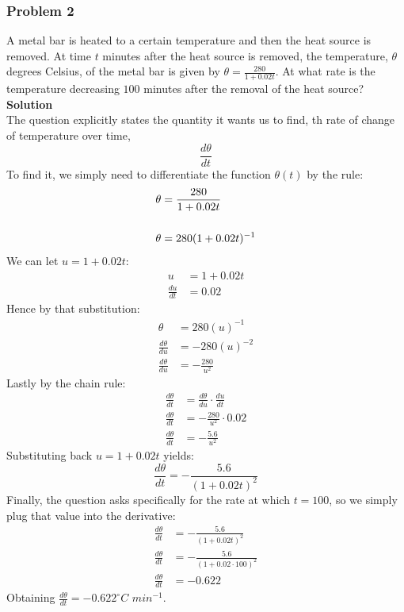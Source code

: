 \documentclass[hidelinks, a4paper, 12pt]{article}
\newcommand{\bd}{\textbf}
\newcommand{\n}{\\[\baselineskip]}
\begin{document}
            \subsubsection{Problem 2}
                A metal bar is heated to a certain temperature and then the heat source is removed. At time $t$ minutes after the heat source is removed,
                the temperature, $\theta$ degrees Celsius, of the metal bar is given by $\theta = \frac{280}{1+0.02t}$. At what rate is the temperature
                decreasing $100$ minutes after the removal of the heat source?\n
                \bd{Solution}\n
                The question explicitly states the quantity it wants us to find, th rate of change of temperature over time,
                \[\frac{d\theta}{dt}\]
                To find it, we simply need to differentiate the function $\theta(t)$ by the rule:
                \[\begin{split}
                    \theta &= \frac{280}{1+0.02t}\n
                    \theta &= 280(1+0.02t)^{-1}\\
                \end{split}\]
                We can let $u = 1+0.02t$:
                \[\begin{split}
                    u &= 1 + 0.02t\\
                    \frac{du}{dt} &= 0.02
                \end{split}\]
                Hence by that substitution:
                \[\begin{split}
                    \theta &= 280(u)^{-1}\\
                    \frac{d\theta}{du} &= -280(u)^{-2}\\
                    \frac{d\theta}{du} &= -\frac{280}{u^2}
                \end{split}\]
                Lastly by the chain rule:
                \[\begin{split}
                    \frac{d\theta}{dt} &= \frac{d\theta}{du} \cdot \frac{du}{dt}\\
                    \frac{d\theta}{dt} &= -\frac{280}{u^2} \cdot 0.02\\
                    \frac{d\theta}{dt} &= -\frac{5.6}{u^2}
                \end{split}\]
                Substituting back $u = 1+0.02t$ yields:
                \[\frac{d\theta}{dt} = -\frac{5.6}{(1 + 0.02t)^2}\]
                Finally, the question asks specifically for the rate at which $t=100$, so we simply plug that value into the derivative:
                \[\begin{split}
                    \frac{d\theta}{dt} &= -\frac{5.6}{(1 + 0.02t)^2}\\
                    \frac{d\theta}{dt} &= -\frac{5.6}{(1 + 0.02\cdot 100)^2}\\
                    \frac{d\theta}{dt} &= -0.622
                \end{split}\]
                Obtaining $\frac{d\theta}{dt} = -0.622^{\circ}C$ $min^{-1}$.
\end{document}
